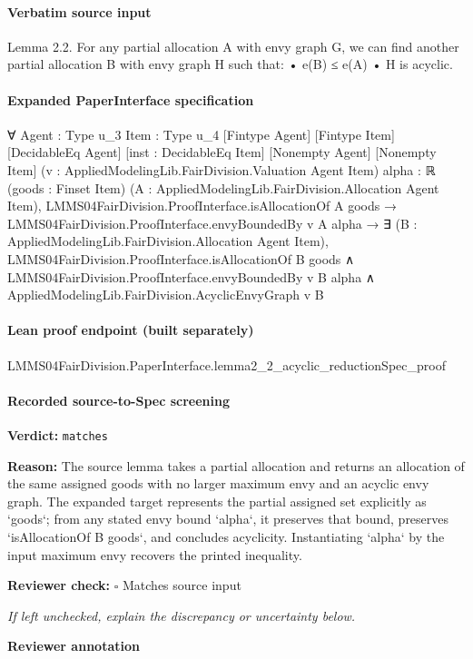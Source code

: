 \documentclass[10pt]{article}
\newcommand{\reviewerbox}{%
  \par\noindent\fbox{\parbox{0.96\linewidth}{\rule{0pt}{0.38in}}}\par
}
\newcommand{\reviewmatch}[1]{%
  \par\noindent\textbf{Reviewer check:} $\square$\; #1\par
  \noindent\emph{If left unchecked, explain the discrepancy or uncertainty below.}\par
}
\begin{document}
\paragraph{Verbatim source input}
\begin{ReviewVerbatim}
Lemma 2.2. For any partial allocation A with envy graph
G, we can find another partial allocation B with envy graph
H such that:
• e(B) ≤ e(A)
• H is acyclic.
\end{ReviewVerbatim}



\paragraph{Expanded PaperInterface specification}
\begin{ReviewVerbatim}
∀ {Agent : Type u_3} {Item : Type u_4} [Fintype Agent] [Fintype Item] [DecidableEq Agent] [inst : DecidableEq Item]
  [Nonempty Agent] [Nonempty Item] (v : AppliedModelingLib.FairDivision.Valuation Agent Item) {alpha : ℝ}
  (goods : Finset Item) (A : AppliedModelingLib.FairDivision.Allocation Agent Item),
  LMMS04FairDivision.ProofInterface.isAllocationOf A goods →
    LMMS04FairDivision.ProofInterface.envyBoundedBy v A alpha →
      ∃ (B : AppliedModelingLib.FairDivision.Allocation Agent Item),
        LMMS04FairDivision.ProofInterface.isAllocationOf B goods ∧
          LMMS04FairDivision.ProofInterface.envyBoundedBy v B alpha ∧
            AppliedModelingLib.FairDivision.AcyclicEnvyGraph v B
\end{ReviewVerbatim}



\paragraph{Lean proof endpoint (built separately)}\begin{ReviewVerbatim}
LMMS04FairDivision.PaperInterface.lemma2_2_acyclic_reductionSpec_proof
\end{ReviewVerbatim}

\paragraph{Recorded source-to-Spec screening}
\textbf{Verdict:} \texttt{matches}
\\
{\raggedright
\textbf{Reason:} The source lemma takes a partial allocation and returns an allocation of the same assigned goods with no larger maximum envy and an acyclic envy graph.\allowbreak{} The expanded target represents the partial assigned set explicitly as `goods`;\allowbreak{} from any stated envy bound `alpha`, it preserves that bound, preserves `isAllocationOf B goods`, and concludes acyclicity.\allowbreak{} Instantiating `alpha` by the input maximum envy recovers the printed inequality.\allowbreak{}
\par}
\reviewmatch{Matches source input}
\noindent\textbf{Reviewer annotation}\par
\reviewerbox
\clearpage
\hypertarget{source-claim-699685670f75744b}{}
\end{document}
